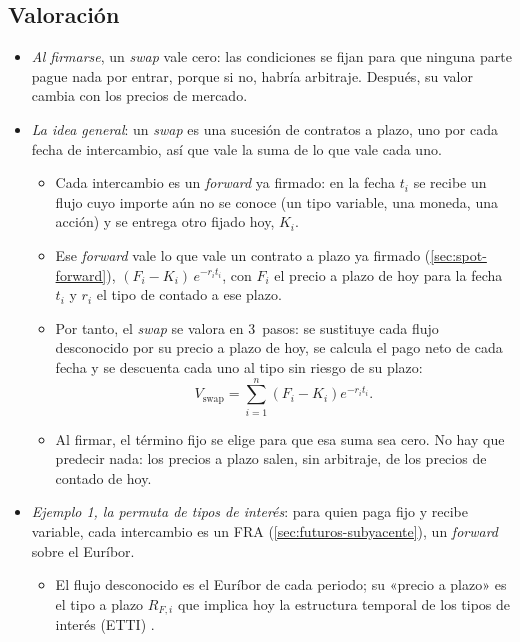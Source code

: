 \documentclass[11pt]{article}
\begin{document}
\subsection{Valoración}\label{sec:valoracion-swaps}

\begin{itemize}
\item \emph{Al firmarse}, un \emph{swap} vale cero: las condiciones se fijan para que ninguna parte pague nada por entrar, porque si no, habría arbitraje. Después, su valor cambia con los precios de mercado.
\item \emph{La idea general}: un \emph{swap} es una sucesión de contratos a plazo, uno por cada fecha de intercambio, así que vale la suma de lo que vale cada uno.
  \begin{itemize}
  \item Cada intercambio es un \emph{forward} ya firmado: en la fecha $t_i$ se recibe un flujo cuyo importe aún no se conoce (un tipo variable, una moneda, una acción) y se entrega otro fijado hoy, $K_i$.
  \item Ese \emph{forward} vale lo que vale un contrato a plazo ya firmado (\ref{sec:spot-forward}), $(F_i-K_i)\,e^{-r_it_i}$, con $F_i$ el precio a plazo de hoy para la fecha $t_i$ y $r_i$ el tipo de contado a ese plazo.
  \item Por tanto, el \emph{swap} se valora en 3~pasos: se sustituye cada flujo desconocido por su precio a plazo de hoy, se calcula el pago neto de cada fecha y se descuenta cada uno al tipo sin riesgo de su plazo:
  \begin{equation}\label{eq:valor-swap-general}
  V_{\mathrm{swap}}=\sum_{i=1}^{n}\left(F_i-K_i\right)e^{-r_it_i}.
  \end{equation}
  \item Al firmar, el término fijo se elige para que esa suma sea cero. No hay que predecir nada: los precios a plazo salen, sin arbitraje, de los precios de contado de hoy.
  \end{itemize}
\item \emph{Ejemplo 1, la permuta de tipos de interés}: para quien paga fijo y recibe variable, cada intercambio es un FRA (\ref{sec:futuros-subyacente}), un \emph{forward} sobre el Euríbor.
  \begin{itemize}
  \item El flujo desconocido es el Euríbor de cada periodo; su «precio a plazo» es el tipo a plazo $R_{F,i}$ que implica hoy la estructura temporal de los tipos de interés (ETTI) .

\end{itemize}
\end{itemize}
\end{document}
